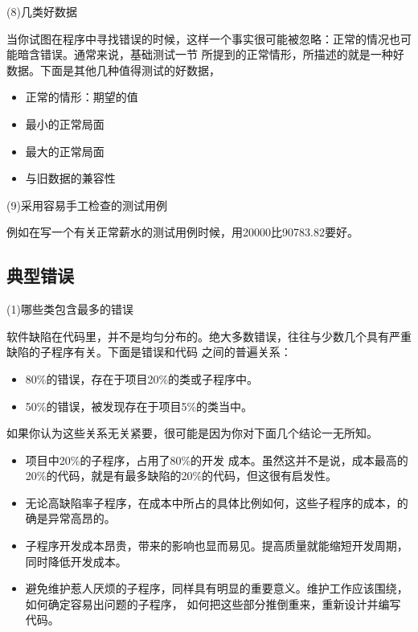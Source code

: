 \documentclass{article}
\begin{document}
\par
(8)几类好数据
\par
当你试图在程序中寻找错误的时候，这样一个事实很可能被忽略：正常的情况也可能暗含错误。通常来说，基础测试一节
所提到的正常情形，所描述的就是一种好数据。下面是其他几种值得测试的好数据，
\begin{itemize}
    \item 正常的情形：期望的值
    \item 最小的正常局面
    \item 最大的正常局面
    \item 与旧数据的兼容性
\end{itemize}

\par
(9)采用容易手工检查的测试用例
\par
例如在写一个有关正常薪水的测试用例时候，用20000比90783.82要好。

\subsection{典型错误}
\par
(1)哪些类包含最多的错误
\par
软件缺陷在代码里，并不是均匀分布的。绝大多数错误，往往与少数几个具有严重缺陷的子程序有关。下面是错误和代码
之间的普遍关系：
\begin{itemize}
    \item 80\%的错误，存在于项目20\%的类或子程序中。
    \item 50\%的错误，被发现存在于项目5\%的类当中。
\end{itemize}
如果你认为这些关系无关紧要，很可能是因为你对下面几个结论一无所知。
\begin{itemize}
    \item 项目中20\%的子程序，占用了80\%的开发
    成本。虽然这并不是说，成本最高的20\%的代码，就是有最多缺陷的20\%的代码，但这很有启发性。
    \item 无论高缺陷率子程序，在成本中所占的具体比例如何，这些子程序的成本，的确是异常高昂的。
    \item 子程序开发成本昂贵，带来的影响也显而易见。提高质量就能缩短开发周期，同时降低开发成本。
    \item 避免维护惹人厌烦的子程序，同样具有明显的重要意义。维护工作应该围绕，如何确定容易出问题的子程序，
    如何把这些部分推倒重来，重新设计并编写代码。
\end{itemize}
\end{document}
